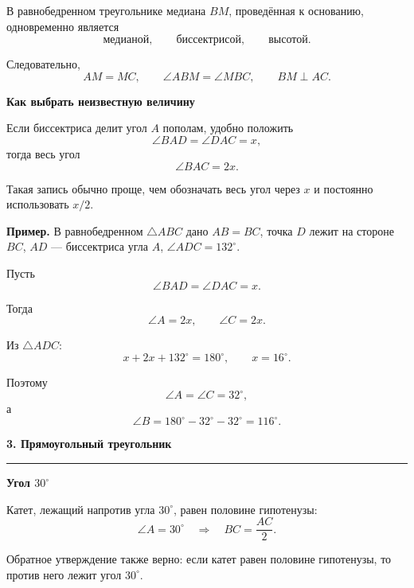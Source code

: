 \documentclass[a4paper,12pt]{article}
\newcommand{\Section}[1]{%
  \Needspace{5\baselineskip}%
  \vspace{0.6em}%
  {\Large\bfseries\color{darkaccent}#1}\par
  \vspace{0.2em}%
  {\color{accent}\rule{0.14\linewidth}{1.2pt}}\par
  \vspace{0.4em}%
}
\newcommand{\Subsection}[1]{%
  \Needspace{3\baselineskip}%
  \vspace{0.45em}%
  {\large\bfseries\color{darkaccent}#1}\par
  \vspace{0.15em}%
}
\newcommand{\Key}[1]{\textbf{\color{darkaccent}#1}}
\newcommand{\degree}{^{\circ}}
\begin{document}
В равнобедренном треугольнике медиана $BM$, проведённая к основанию,
одновременно является
\[
  \text{медианой},
  \qquad
  \text{биссектрисой},
  \qquad
  \text{высотой}.
\]

Следовательно,
\[
  AM=MC,
  \qquad
  \angle ABM=\angle MBC,
  \qquad
  BM\perp AC.
\]

\Subsection{Как выбрать неизвестную величину}

Если биссектриса делит угол $A$ пополам, удобно положить
\[
  \angle BAD=\angle DAC=x,
\]
тогда весь угол
\[
  \angle BAC=2x.
\]

Такая запись обычно проще, чем обозначать весь угол через $x$ и постоянно
использовать $x/2$.

\Key{Пример.}
В равнобедренном $\triangle ABC$ дано $AB=BC$,
точка $D$ лежит на стороне $BC$, $AD$ — биссектриса угла $A$,
$\angle ADC=132\degree$.

Пусть
\[
  \angle BAD=\angle DAC=x.
\]

Тогда
\[
  \angle A=2x,
  \qquad
  \angle C=2x.
\]

Из $\triangle ADC$:
\[
  x+2x+132\degree=180\degree,
  \qquad
  x=16\degree.
\]

Поэтому
\[
  \angle A=\angle C=32\degree,
\]
а
\[
  \angle B
  =180\degree-32\degree-32\degree
  =116\degree.
\]

\clearpage

\Section{3. Прямоугольный треугольник}

\Subsection{Угол $30\degree$}

Катет, лежащий напротив угла $30\degree$, равен половине гипотенузы:
\[
  \angle A=30\degree
  \quad\Longrightarrow\quad
  BC=\frac{AC}{2}.
\]

Обратное утверждение также верно: если катет равен половине гипотенузы,
то против него лежит угол $30\degree$.

\begin{center}
\end{center}
\end{document}
